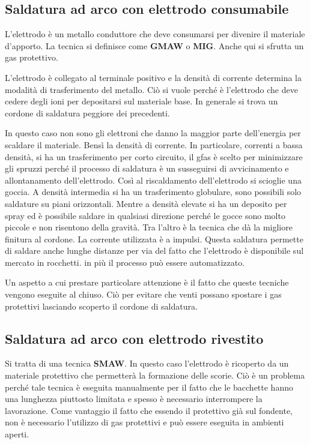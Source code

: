 \subsection{Saldatura ad arco con elettrodo consumabile}
L'elettrodo è un metallo conduttore che deve consumarsi per divenire il materiale d'apporto.
La tecnica si definisce come \textbf{GMAW} o \textbf{MIG}. 
Anche qui si sfrutta un gas protettivo.

L'elettrodo è collegato al terminale positivo e la densità di corrente determina la modalità di trasferimento del metallo.
Ciò si vuole perché è l'elettrodo che deve cedere degli ioni per depositarsi sul materiale base. In generale si trova un cordone di saldatura peggiore dei precedenti.

In questo caso non sono gli elettroni che danno la maggior parte dell'energia per scaldare il materiale. Bensì la densità di corrente.
In particolare, correnti a bassa densità, si ha un trasferimento per corto circuito, il gfas è scelto per minimizzare gli spruzzi perché il processo di saldatura è un susseguirsi di avvicinamento e allontanamento dell'elettrodo. Così al riscaldamento dell'elettrodo si scioglie una goccia.
A densità intermedia si ha un trasferimento globulare, sono possibili solo saldature su piani orizzontali.
Mentre a densità elevate si ha un deposito per spray ed è possibile saldare in qualsiasi direzione perché le gocce sono molto piccole e non risentono della gravità. Tra l'altro è la tecnica che dà la migliore finitura al cordone.
La corrente utilizzata è a impulsi.
Questa saldatura permette di saldare anche lunghe distanze per via del fatto che l'elettrodo è disponibile sul mercato in rocchetti.
in più il processo può essere automatizzato.

Un aspetto a cui prestare particolare attenzione è il fatto che queste tecniche vengono eseguite al chiuso. Ciò per evitare che venti possano spostare i gas protettivi lasciando scoperto il cordone di saldatura.

\subsection{Saldatura ad arco con elettrodo rivestito}
Si tratta di una tecnica \textbf{SMAW}. In questo caso l'elettrodo è ricoperto da un materiale protettivo che permetterà la formazione delle scorie.
Ciò è un problema perché tale tecnica è eseguita manualmente per il fatto che le bacchette hanno una lunghezza piuttosto limitata e spesso è necessario interrompere la lavorazione.
Come vantaggio il fatto che essendo il protettivo già sul fondente, non è necessario l'utilizzo di gas protettivi e può essere eseguita in ambienti aperti.

